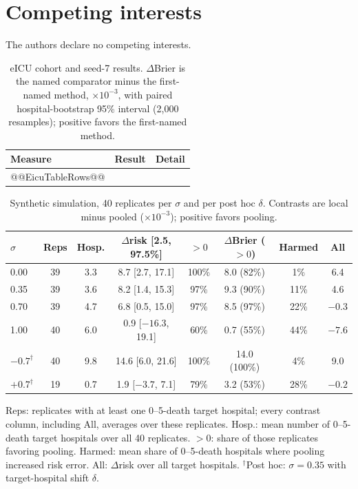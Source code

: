 \documentclass[11pt]{article}
\begin{document}
\section*{Competing interests}
The authors declare no competing interests.

\clearpage
\begin{table}[p]
\caption{eICU cohort and seed-7 results. $\Delta$Brier is the named comparator minus the first-named method, $\times10^{-3}$, with paired hospital-bootstrap 95\% interval (2,000 resamples); positive favors the first-named method.}
\label{tab:eicu}
\centering\footnotesize
\begin{tabularx}{\textwidth}{@{}p{}p{}X@{}}
\toprule
Measure & Result & Detail \\
\midrule
@@EicuTableRows@@
\bottomrule
\end{tabularx}
\end{table}

\begin{table}[p]
\caption{Synthetic simulation, 40 replicates per $\sigma$ and per post hoc $\delta$. Contrasts are local minus pooled ($\times10^{-3}$); positive favors pooling.}
\label{tab:sim}
\centering\footnotesize
\setlength{\tabcolsep}{2.2pt}
\begin{tabular}{@{}lccccccc@{}}
\toprule
$\sigma$ & Reps & Hosp. & $\Delta$risk [2.5, 97.5\%] & $>0$ & $\Delta$Brier ($>0$) & Harmed & All \\
\midrule
0.00 & 39 & 3.3 & 8.7 [2.7, 17.1] & 100\% & 8.0 (82\%) & 1\% & 6.4 \\
0.35 & 39 & 3.6 & 8.2 [1.4, 15.3] & 97\% & 9.3 (90\%) & 11\% & 4.6 \\
0.70 & 39 & 4.7 & 6.8 [0.5, 15.0] & 97\% & 8.5 (97\%) & 22\% & $-0.3$ \\
1.00 & 40 & 6.0 & 0.9 [$-16.3$, 19.1] & 60\% & 0.7 (55\%) & 44\% & $-7.6$ \\
\midrule
$-0.7^\dagger$ & 40 & 9.8 & 14.6 [6.0, 21.6] & 100\% & 14.0 (100\%) & 4\% & 9.0 \\
$+0.7^\dagger$ & 19 & 0.7 & 1.9 [$-3.7$, 7.1] & 79\% & 3.2 (53\%) & 28\% & $-0.2$ \\
\bottomrule
\end{tabular}

\vspace{2pt}
{\scriptsize Reps: replicates with at least one 0--5-death target hospital; every contrast column, including All, averages over these replicates. Hosp.: mean number of 0--5-death target hospitals over all 40 replicates. $>0$: share of those replicates favoring pooling. Harmed: mean share of 0--5-death hospitals where pooling increased risk error. All: $\Delta$risk over all target hospitals. $^\dagger$Post hoc: $\sigma=0.35$ with target-hospital shift $\delta$.}
\end{table}
\end{document}
